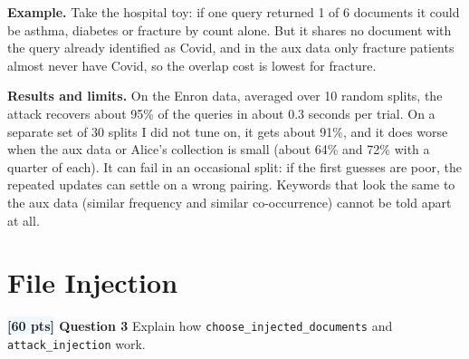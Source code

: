 \documentclass[12pt]{article}
\newcommand{\question}[2]{\textbf{\colorbox{aliceblue}{[#2 pts]} Question #1}}
\begin{document}
\begin{answer}
    \textbf{Example.}
    Take the hospital toy: if one query returned 1 of 6 documents it could be asthma, diabetes or fracture by count alone.
    But it shares no document with the query already identified as Covid, and in the aux data only fracture patients almost never have Covid, so the overlap cost is lowest for fracture.

    \textbf{Results and limits.}
    On the Enron data, averaged over 10 random splits, the attack recovers about 95\% of the queries in about 0.3 seconds per trial.
    On a separate set of 30 splits I did not tune on, it gets about 91\%, and it does worse when the aux data or Alice's collection is small (about 64\% and 72\% with a quarter of each).
    It can fail in an occasional split: if the first guesses are poor, the repeated updates can settle on a wrong pairing.
    Keywords that look the same to the aux data (similar frequency and similar co-occurrence) cannot be told apart at all.
\end{answer}

\Needspace{9cm}
\section{File Injection}

\question{3}{60} Explain how \texttt{choose\_injected\_documents} and \texttt{attack\_injection} work.
\end{document}
